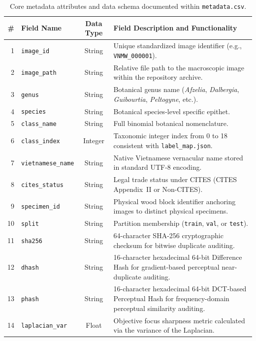 \documentclass[a4paper,fleqn,12pt]{cas-sc}
\begin{document}
\begin{table}[pos=htbp]
\centering
\small
\setlength{\tabcolsep}{4pt}
\renewcommand{\arraystretch}{1.12}
\caption{Core metadata attributes and data schema documented within \texttt{metadata.csv}.}
\label{tab:metadata_fields}
\begin{tabularx}{\linewidth}{@{} r l c X @{}}
\toprule
\textbf{\#} & \textbf{Field Name} & \textbf{Data Type} & \textbf{Field Description and Functionality} \\
\midrule
1 & \texttt{image\_id} & String & Unique standardized image identifier (e.g., \texttt{VNMW\_000001}). \\
2 & \texttt{image\_path} & String & Relative file path to the macroscopic image within the repository archive. \\
3 & \texttt{genus} & String & Botanical genus name (\textit{Afzelia}, \textit{Dalbergia}, \textit{Guibourtia}, \textit{Peltogyne}, etc.). \\
4 & \texttt{species} & String & Botanical species-level specific epithet. \\
5 & \texttt{class\_name} & String & Full binomial botanical nomenclature. \\
6 & \texttt{class\_index} & Integer & Taxonomic integer index from 0 to 18 consistent with \texttt{label\_map.json}. \\
7 & \texttt{vietnamese\_name} & String & Native Vietnamese vernacular name stored in standard UTF-8 encoding. \\
8 & \texttt{cites\_status} & String & Legal trade status under CITES (CITES Appendix~II or Non-CITES). \\
9 & \texttt{specimen\_id} & String & Physical wood block identifier anchoring images to distinct physical specimens. \\
10 & \texttt{split} & String & Partition membership (\texttt{train}, \texttt{val}, or \texttt{test}). \\
11 & \texttt{sha256} & String & 64-character SHA-256 cryptographic checksum for bitwise duplicate auditing. \\
12 & \texttt{dhash} & String & 16-character hexadecimal 64-bit Difference Hash for gradient-based perceptual near-duplicate auditing. \\
13 & \texttt{phash} & String & 16-character hexadecimal 64-bit DCT-based Perceptual Hash for frequency-domain perceptual similarity auditing. \\
14 & \texttt{laplacian\_var} & Float & Objective focus sharpness metric calculated via the variance of the Laplacian. \\
\bottomrule
\end{tabularx}
\end{table}
\end{document}
